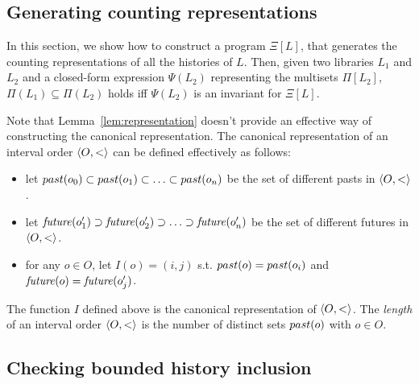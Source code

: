 \subsection{Generating counting representations}


In this section, we show how to construct a program $\Xi[L]$, that generates the counting representations
of all the histories of $L$. Then, given two libraries $L_1$ and $L_2$ and a closed-form expression $\Psi(L_2)$ 
representing the multisets $\Pi[L_2]$, $\Pi(L_1) \subseteq \Pi(L_2)$ holds iff $\Psi(L_2)$ is an invariant for $\Xi[L]$.


Note that Lemma~\ref{lem:representation} doesn't provide an effective way of
constructing the canonical representation. 
The canonical representation of an interval order $\left\langle {O,<} \right\rangle$ can be defined
effectively as follows:
\begin{itemize}

	\item let $past({o_0})\subset past({o_1})\subset \ldots\subset
past({o_n})$ be the set of different pasts in $\left\langle {O,<} \right\rangle$. 

	\item let $\mathit{future}({o_1'})\supset \mathit{future}({o_2'})\supset \ldots\supset
\mathit{future}({o_n'})$ be the set of different futures in $\left\langle {O,<} \right\rangle$.

	\item for any $o\in O$, let $I(o)=(i,j)$ s.t. $past({o})=past({o_i})$ and
$\mathit{future}({o})=\mathit{future}({o_j'})$.

\end{itemize}

\begin{lemma}

  The function $I$ defined above is the canonical representation of
  $\left\langle {O,<} \right\rangle$. The \emph{length} of an interval order $\left\langle {O,<} \right\rangle$ is the number
  of distinct sets $past({o})$ with $o\in O$.

\end{lemma}

\subsection{Checking bounded history inclusion}



